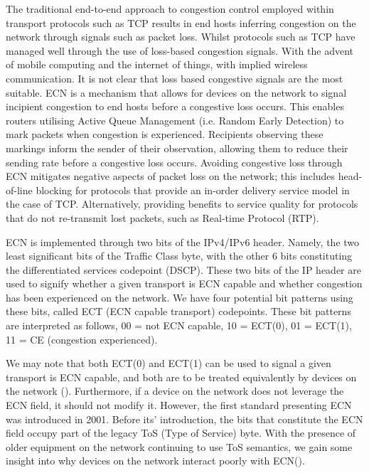 \documentclass{l4proj}
\begin{document}
The traditional end-to-end approach to congestion control employed within transport protocols such as TCP results in end hosts inferring congestion on the network through signals such as packet loss. Whilst protocols such as TCP have managed well through the use of loss-based congestion signals. With the advent of mobile computing and the internet of things, with implied wireless communication. It is not clear that loss based congestive signals are the most suitable.
ECN is a mechanism that allows for devices on the network to signal incipient congestion to end hosts before a congestive loss occurs. This enables routers utilising Active Queue Management (i.e. Random Early Detection) to mark packets when congestion is experienced. Recipients observing these markings inform the sender of their observation, allowing them to reduce their sending rate before a congestive loss occurs. Avoiding congestive loss through ECN mitigates negative aspects of packet loss on the network; this includes head-of-line blocking for protocols that provide an in-order delivery service model in the case of TCP. Alternatively, providing benefits to service quality for protocols that do not re-transmit lost packets, such as Real-time Protocol (RTP).

ECN is implemented through two bits of the IPv4/IPv6 header. Namely, the two least significant bits of the Traffic Class byte, with the other 6 bits constituting the differentiated services codepoint (DSCP). These two bits of the IP header are used to signify whether a given transport is ECN capable and whether congestion has been experienced on the network. We have four potential bit patterns using these bits, called ECT (ECN capable transport) codepoints. These bit patterns are interpreted as follows, 00 = not ECN capable, 10 = ECT(0), 01 = ECT(1), 11 = CE (congestion experienced).

We may note that both ECT(0) and ECT(1) can be used to signal a given transport is ECN capable, and both are to be treated equivalently by devices on the network (\cite{floyd_addition_2001}). Furthermore, if a device on the network does not leverage the ECN field, it should not modify it. However, the first standard presenting ECN was introduced in 2001. Before its' introduction, the bits that constitute the ECN field occupy part of the legacy ToS (Type of Service) byte. With the presence of older equipment on the network continuing to use ToS semantics, we gain some insight into why devices on the network interact poorly with ECN(\cite{kuhlewind_state_2013}).
\end{document}
